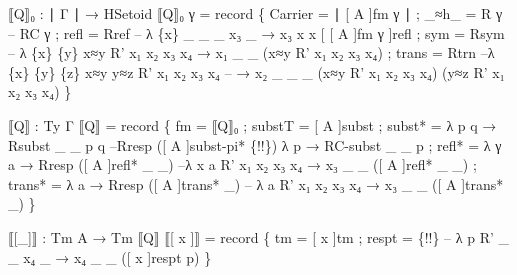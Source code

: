 {\begin{code}
{  ⟦Q⟧₀ : ∣ Γ ∣ → HSetoid
  ⟦Q⟧₀ γ =
         record
         \{ Carrier = ∣ [ A ]fm γ ∣
         ; \_≈h\_ = R γ -- RC γ
         ; refl = Rref -- λ \{x\} \_ \_ \_ x₃ \_ → x₃ x x [ [ A ]fm γ ]refl
         ; sym = Rsym -- λ \{x\} \{y\} x≈y R' x₁ x₂ x₃ x₄ → x₁ \_ \_ (x≈y R' x₁ x₂ x₃ x₄)
         ; trans = Rtrn --λ \{x\} \{y\} \{z\} x≈y y≈z R' x₁ x₂ x₃ x₄ 
                   -- → x₂ \_ \_ \_ (x≈y R' x₁ x₂ x₃ x₄) (y≈z R' x₁ x₂ x₃ x₄)
         \}


  ⟦Q⟧ : Ty Γ
  ⟦Q⟧ = record 
    \{ fm = ⟦Q⟧₀
    ; substT = [ A ]subst
    ; subst* = λ p q → Rsubst \_ \_ p q --Rresp ([ A ]subst-pi* \{!!\})  λ p → RC-subst \_ \_ p
    ; refl* = λ γ a → Rresp ([ A ]refl* \_ \_) --λ x a R' x₁ x₂ x₃ x₄ → x₃ \_ \_ ([ A ]refl* \_ \_)
    ; trans* = λ a → Rresp ([ A ]trans* \_) -- λ a R' x₁ x₂ x₃ x₄ → x₃ \_ \_ ([ A ]trans* \_)
    \}

  ⟦[\_]⟧ : Tm A → Tm ⟦Q⟧
  ⟦[ x ]⟧ = record
           \{ tm = [ x ]tm
           ; respt = \{!!\} -- λ p R' \_ \_ x₄ \_ → x₄ \_ \_ ([ x ]respt p)
           \}



}
\end{code}}
